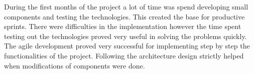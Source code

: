 During the first months of the project a lot of time was spend developing small components and testing
the technologies. This created the base for productive sprints. There were difficulties in the implementation
however the time spent testing out the technologies proved very useful in solving the problems quickly. The agile
development proved very successful for implementing step by step the functionalities of the project. Following
the architecture design strictly helped when modifications of components were done. 